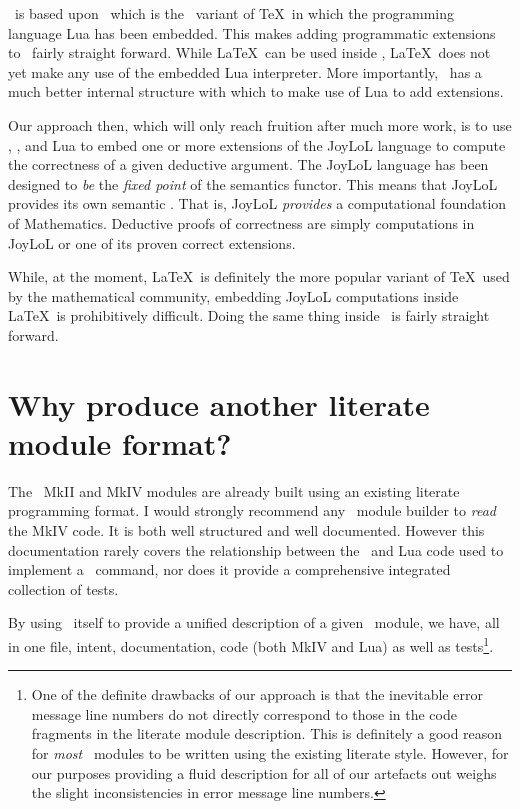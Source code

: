 \ConTeXt\ is based upon \LuaTeX\ which is the \pdfTeX\ variant of \TeX\ in 
which the programming language Lua has been embedded. This makes adding 
programmatic extensions to \ConTeXt\ fairly straight forward. While \LaTeX\ 
can be used inside \LuaTeX, \LaTeX\ does not yet make any use of the 
embedded Lua interpreter. More importantly, \ConTeXt\, has a much better 
internal structure with which to make use of Lua to add extensions. 

Our approach then, which will only reach fruition after much more work, is 
to use \ConTeXt, \LuaTeX, and Lua to embed one or more extensions of the 
JoyLoL language to compute the correctness of a given deductive argument. 
The JoyLoL language has been designed to \emph{be} the \emph{fixed point} 
of the semantics functor. This means that JoyLoL provides its own semantic 
\quote{meaning}. That is, JoyLoL \emph{provides} a computational 
foundation of Mathematics. Deductive proofs of correctness are simply 
computations in JoyLoL or one of its proven correct extensions. 

While, at the moment, \LaTeX\ is definitely the more popular variant of 
\TeX\ used by the mathematical community, embedding JoyLoL computations 
inside \LaTeX\ is prohibitively difficult. Doing the same thing inside 
\ConTeXt\ is fairly straight forward. 

\section{Why produce another literate module format?} 

The \ConTeXt\ MkII and MkIV modules are already built using an existing 
literate programming format. I would strongly recommend any \ConTeXt\ 
module builder to \emph{read} the MkIV code. It is both well structured 
and well documented. However this documentation rarely covers the 
relationship between the \LuaTeX\ and Lua code used to implement a 
\ConTeXt\ command, nor does it provide a comprehensive integrated 
collection of tests. 

By using \ConTeXt\ itself to provide a unified description of a given 
\ConTeXt\ module, we have, all in one file, intent, documentation, code 
(both MkIV and Lua) as well as tests\footnote{One of the definite 
drawbacks of our \type{t-literate-modules} approach is that the inevitable 
error message line numbers do not directly correspond to those in the code 
fragments in the literate module description. This is definitely a good 
reason for \emph{most} \ConTeXt\ modules to be written using the existing 
literate style. However, for our purposes providing a fluid description 
for all of our artefacts out weighs the slight inconsistencies in error 
message line numbers.}. 

